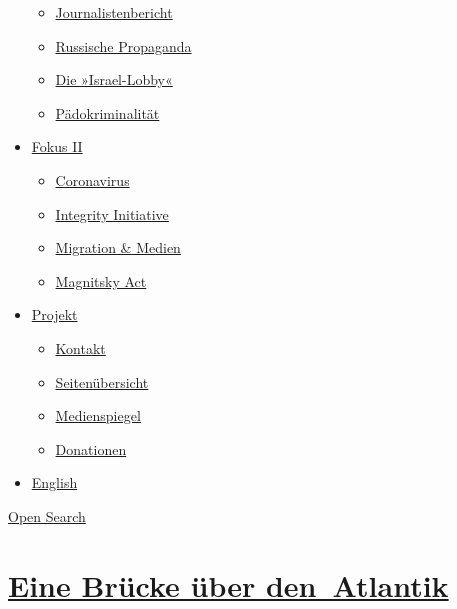 \begin{itemize}
  \begin{itemize}
  \tightlist
  \item
    \href{https://swprs.org/bericht-eines-journalisten/}{Journalistenbericht}
  \item
    \href{https://swprs.org/russische-propaganda/}{Russische Propaganda}
  \item
    \href{https://swprs.org/die-israel-lobby-fakten-und-mythen/}{Die
    »Israel-Lobby«}
  \item
    \href{https://swprs.org/geopolitik-und-paedokriminalitaet/}{Pädokriminalität}
  \end{itemize}
\item
  \href{https://swprs.org/migration-und-medien/}{Fokus II}

  \begin{itemize}
  \tightlist
  \item
    \href{https://swprs.org/covid-19-hinweis-ii/}{Coronavirus}
  \item
    \href{https://swprs.org/die-integrity-initiative/}{Integrity
    Initiative}
  \item
    \href{https://swprs.org/migration-und-medien/}{Migration \& Medien}
  \item
    \href{https://swprs.org/der-fall-magnitsky/}{Magnitsky Act}
  \end{itemize}
\item
  \href{https://swprs.org/kontakt/}{Projekt}

  \begin{itemize}
  \tightlist
  \item
    \href{https://swprs.org/kontakt/}{Kontakt}
  \item
    \href{https://swprs.org/uebersicht/}{Seitenübersicht}
  \item
    \href{https://swprs.org/medienspiegel/}{Medienspiegel}
  \item
    \href{https://swprs.org/donationen/}{Donationen}
  \end{itemize}
\item
  \href{https://swprs.org/contact/}{English}
\end{itemize}

\protect\hyperlink{}{Open Search}

\hypertarget{eine-bruxfccke-uxfcber-den-atlantik}{%
\section{\texorpdfstring{\href{https://swprs.org/2017/03/01/eine-bruecke-ueber-den-atlantik/}{Eine
Brücke über
den~Atlantik}}{Eine Brücke über den~Atlantik}}\label{eine-bruxfccke-uxfcber-den-atlantik}}

